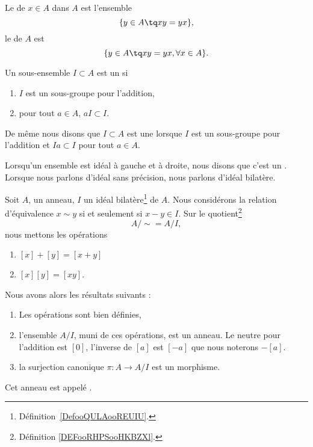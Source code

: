 \begin{definition}
	Le  de \( x\in A\) dans \( A\) est l'ensemble
	\begin{equation}
		\{ y\in A\tq xy=yx \},
	\end{equation}
	le  de \( A\) est
	\begin{equation}
		\{ y\in A\tq xy=yx,\forall x\in A \}.
	\end{equation}
\end{definition}

\begin{definition}  \label{DefooQULAooREUIU}
	Un sous-ensemble \( I\subset A\) est un  si
	\begin{enumerate}
		\item
		      \( I\) est un sous-groupe pour l'addition,
		\item
		      pour tout \( a\in A\), \( aI\subset I\).
	\end{enumerate}
	De même nous disons que \( I\subset A\) est une  lorsque \( I\) est un sous-groupe pour l'addition et \( Ia\subset I\) pour tout \( a\in A\).

	Lorsqu'un ensemble est idéal à gauche et à droite, nous disons que c'est un . Lorsque nous parlons d'idéal sans précision, nous parlons d'idéal bilatère.
\end{definition}

\begin{propositionDef}      \label{PROPooGXMRooTcUGbi}
	Soit \( A\), un anneau, \( I\) un idéal bilatère\footnote{Définition~\ref{DefooQULAooREUIU}.} de \( A\). Nous considérons la relation d'équivalence \( x\sim y\) si et seulement si \( x-y\in I\). Sur le quotient\footnote{Définition \ref{DEFooRHPSooHKBZXl}.}
	\begin{equation}
		A/\sim=A/I,
	\end{equation}
	nous mettons les opérations
	\begin{enumerate}
		\item
		      \( [x]+[y]=[x+y]\)
		\item
		      \( [x][y]=[xy]\).
	\end{enumerate}
	Nous avons alors les résultats suivants :
	\begin{enumerate}
		\item       \label{ITEMooEJPEooRKAqmS}
		      Les opérations sont bien définies,
		\item       \label{ITEMooYBEGooTlHgNz}
		      l'ensemble \( A/I\), muni de ces opérations, est un anneau. Le neutre pour l'addition est \( [0]\), l'inverse de \( [a]\) est \( [-a]\) que nous noterons \( -[a]\).
		\item       \label{ITEMooLNRLooMkoWXZ}
		      la surjection canonique \( \pi\colon A\to A/I\) est un morphisme.
	\end{enumerate}
	Cet anneau est appelé .
\end{propositionDef}

